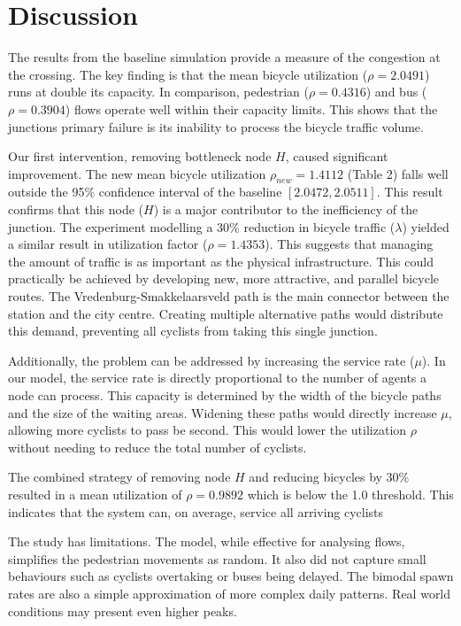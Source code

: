 \documentclass[letterpaper, 10 pt, conference]{ieeeconf}
\begin{document}
\section{Discussion}
The results from the baseline simulation provide a measure of the congestion at the crossing. The key finding is that the mean bicycle utilization ($\rho=2.0491$) runs at double its capacity. In comparison, pedestrian ($\rho=0.4316$) and bus ($\rho=0.3904$) flows operate well within their capacity limits. This shows that the junctions primary failure is its inability to process the bicycle traffic volume.

Our first intervention, removing bottleneck node $H$, caused significant improvement. The new mean bicycle utilization $\rho_{new}=1.4112$ (Table 2) falls well outside the 95\% confidence interval of the baseline $[2.0472, 2.0511]$. This result confirms that this node ($H$) is a major contributor to the inefficiency of the junction. The experiment modelling a 30\% reduction in bicycle traffic ($\lambda$) yielded a similar result in utilization factor ($\rho=1.4353$). This suggests that managing the amount of traffic is as important as the physical infrastructure. This could practically be achieved by developing new, more attractive, and parallel bicycle routes. The Vredenburg-Smakkelaarsveld path is the main connector between the station and the city centre. Creating multiple alternative paths would distribute this demand, preventing all cyclists from taking this single junction.

Additionally, the problem can be addressed by increasing the service rate ($\mu$). In our model, the service rate is directly proportional to the number of agents a node can process. This capacity is determined by the width of the bicycle paths and the size of the waiting areas. Widening these paths would directly increase $\mu$, allowing more cyclists to pass be second. This would lower the utilization $\rho$ without needing to reduce the total number of cyclists. 

The combined strategy of removing node $H$ and reducing bicycles by 30\% resulted in a mean utilization of $\rho=0.9892$ which is below the 1.0 threshold. This indicates that the system can, on average, service all arriving cyclists

The study has limitations. The model, while effective for analysing flows, simplifies the pedestrian movements as random. It also did not capture small behaviours such as cyclists overtaking or buses being delayed. The bimodal spawn rates are also a simple approximation of more complex daily patterns. Real world conditions may present even higher peaks. 
\end{document}
